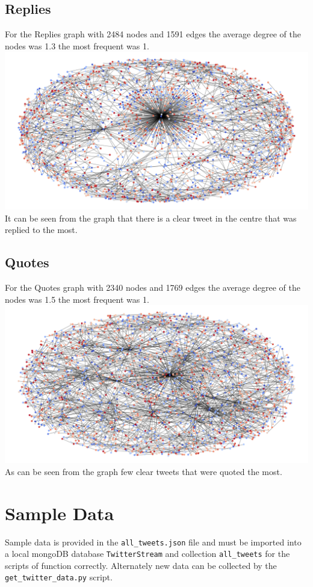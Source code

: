 \documentclass[10pt,a4paper]{article}
\begin{document}
 	\subsection*{Replies}
	For the Replies graph with 2484 nodes and 1591 edges the average degree of the nodes was 1.3 the most frequent was 1.
 	 	\includegraphics[width=\textwidth]{images/replies_graph.png} 
 	 	It can be seen from the graph that there is a clear tweet in the centre that was replied to the most.
 	\subsection*{Quotes}
	For the Quotes graph with 2340 nodes and 1769 edges the average degree of the nodes was 1.5 the most frequent was 1.
	\includegraphics[width=\textwidth]{images/quotes_graph.png} 
	As can be seen from the graph few clear tweets that were quoted the most.

\section*{Sample Data}
	Sample data is provided in the \verb|all_tweets.json| file and must be imported into a local mongoDB database \verb|TwitterStream| and collection \verb|all_tweets| for the scripts of function correctly. Alternately new data can be collected by the \verb|get_twitter_data.py| script.
\end{document}
